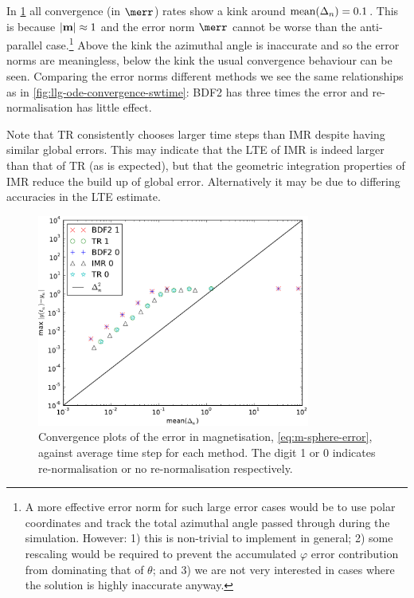 In \cref{fig:llg-ode-convergence-m} all convergence (in $\merr$) rates show a kink around $\operatorname{mean}(\Delta_{n}) = 0.1$.
This is because $\left|{\boldsymbol{\mathrm{m}}} \right| \approx 1$ and the error norm $\merr$ cannot be worse than the anti-parallel case.\footnote{A more effective error norm for such large error cases would be to use polar coordinates and track the total azimuthal angle passed through during the simulation. However: 1) this is non-trivial to implement in general; 2) some rescaling would be required to prevent the accumulated $\varphi$ error contribution from dominating that of $\theta$; and 3) we are not very interested in cases where the solution is highly inaccurate anyway.}
Above the kink the azimuthal angle is inaccurate and so the error norms are meaningless, below the kink the usual convergence behaviour can be seen.
Comparing the error norms different methods we see the same relationships as in \cref{fig:llg-ode-convergence-swtime}: BDF2 has three times the error and re-normalisation has little effect.


Note that TR consistently chooses larger time steps than IMR despite having similar global errors.
This may indicate that the LTE of IMR is indeed larger than that of TR (as is expected), but that the geometric integration properties of IMR reduce the build up of global error.
Alternatively it may be due to differing accuracies in the LTE estimate.



\begin{figure}
  \centering
  \includegraphics[width=0.8\textwidth]{plots/ode_llg_adaptive_convergence/maxoferrornormsvsmeanofdts}
  \caption{Convergence plots of the error in magnetisation, \cref{eq:m-sphere-error}, against average time step for each method. The digit 1 or 0 indicates re-normalisation or no re-normalisation respectively.}
  \label{fig:llg-ode-convergence-m}
\end{figure}

